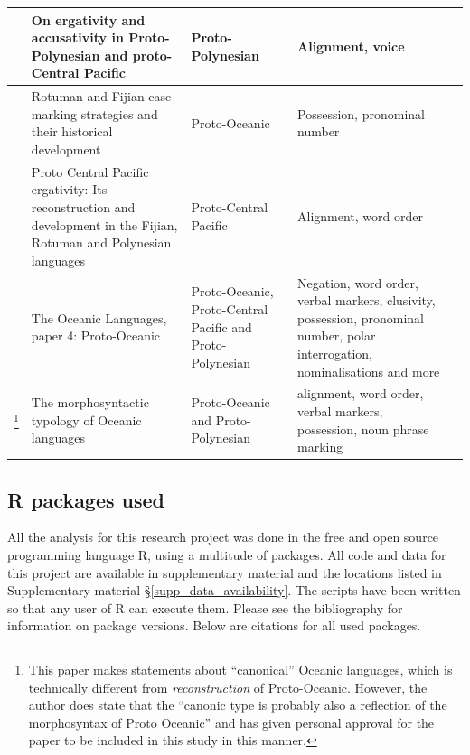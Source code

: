 \documentclass[12pt,letterpaper]{article}
\begin{document}
\begin{longtable}{|p{3cm}|  p{5cm}| p{4cm} | p{3cm}  | p{3cm} |}
\citet{ball2007ergativity} & On ergativity and accusativity in Proto-Polynesian and proto-Central Pacific&Proto-Polynesian & Alignment, voice \\ \hline

\citet{kikusawa2001rotuman} & Rotuman and Fijian case-marking strategies and their historical development  & Proto-Oceanic & Possession, pronominal number \\ \hline

\citet{kikusawa2002proto}  & Proto Central Pacific ergativity: Its reconstruction and development in the Fijian, Rotuman and Polynesian languages & Proto-Central Pacific   & Alignment, word order \\ \hline

\citet{lynchrosscrowley_proto_grammar_oceanic} & The Oceanic Languages, paper 4: Proto-Oceanic & Proto-Oceanic, Proto-Central Pacific and Proto-Polynesian & Negation, word order, verbal markers, clusivity, possession, pronominal number, polar interrogation, nominalisations and more \\ \hline

\citet{ross2004morphosyntactic}\footnote{This paper makes statements about ``canonical'' Oceanic languages, which is technically different from \emph{reconstruction} of Proto-Oceanic. However, the author does state that the ``canonic type is probably also a reflection of the morphosyntax of Proto Oceanic'' \citep[492]{ross2004morphosyntactic} and has given personal approval for the paper to be included in this study in this manner.}  & The morphosyntactic typology of Oceanic languages &  Proto-Oceanic and Proto-Polynesian  & alignment, word order, verbal markers, possession, noun phrase marking \\ \hline
\end{longtable}
\FloatBarrier


\subsection{R packages used}
\label{supp:r_packages}
All the analysis for this research project was done in the free and open source programming language R, using a multitude of packages. All code and data for this project are available in supplementary material and the locations listed in Supplementary material §\ref{supp_data_availability}. The scripts have been written so that any user of R can execute them. Please see the bibliography for information on package versions. Below are citations for all used packages.
\end{document}

